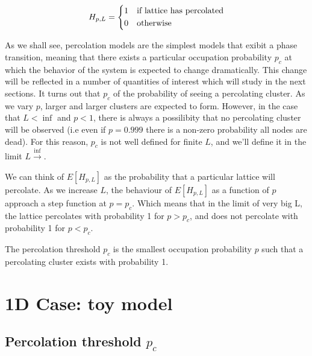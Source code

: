 % 	
%         
%         
\begin{defn}
\[
	H_{p,L} = 
    \begin{dcases}
        1 & \text{if lattice has percolated} \\
        0 & \text{otherwise} \\
    \end{dcases}
\]
\end{defn}
As we shall see, percolation models are the simplest models that exibit a phase transition, meaning that there exists a particular occupation probability $p_c$ at which the behavior of the system is expected to change dramatically. This change will be reflected in a number of quantities of interest which will study in the next sections. It turns out that $p_c$ of the probability of seeing a percolating cluster.
As we vary $p$, larger and larger clusters are expected to form. However, in the case that $L < \inf$ and $p < 1$, there is always a possilibity that no percolating cluster will be observed (i.e even if $p = 0.999$ there is a non-zero probability all nodes are dead). For this reason, $p_c$ is not well defined for finite $L$, and we'll  define it in the limit $L \xrightarrow \inf$. 

We can think of $E[H_{p,L}]$ as the probability that a particular lattice will percolate. As we increase $L$, the behaviour of $E[H_{p,L}]$ as a function of $p$ approach a step function at $p=p_c$. Which means that in the limit of very big L, the lattice percolates with probability 1 for $p > p_c$, and does not percolate with probability 1 for $p < p_c$.  

\begin{defn}
The percolation threshold $p_c$ is the smallest occupation probability $p$ such that a percolating cluster exists with probability 1. 
\end{defn}



\section{1D Case: toy model}\label{sec:1d}

\subsection{Percolation threshold $p_c$}

